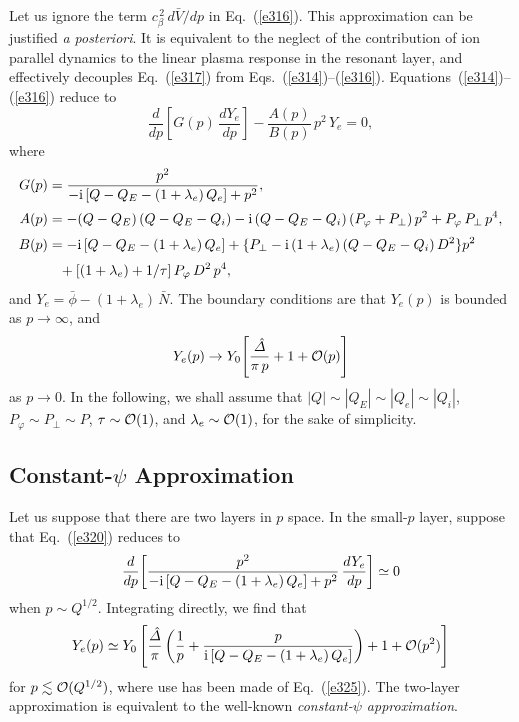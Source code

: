 \documentclass[12pt,prb,aps]{revtex4-1}
\begin{document}
Let us ignore the term $c_\beta^{\,2}\,d\bar{V}/dp$ in Eq.~(\ref{e316}). This approximation can
be justified {\em a posteriori}. It is equivalent to the neglect of the contribution of ion parallel dynamics to the linear  plasma
response in the resonant layer, and effectively decouples Eq.~(\ref{e317}) from Eqs.~(\ref{e314})--(\ref{e316}).\cite{cole,ber} Equations~(\ref{e314})--(\ref{e316}) reduce to\,\cite{cole}
\begin{equation}\label{e320}
\frac{d}{dp}\!\left[G(p)\,\frac{dY_e}{dp}\right] - \frac{A(p)}{B(p)}\,p^{2}\,Y_e = 0,
\end{equation}
where
\begin{align}
G(p)&= \frac{p^2}{-{\rm i}\,[Q-Q_E-(1+\lambda_e)\,Q_e] + p^2},\\[0.5ex]
 A(p) &= -(Q-Q_E)\,(Q-Q_E-Q_i)-{\rm i}\,(Q-Q_E-Q_i)\,(P_\varphi+P_\perp)\,p^2 + P_\varphi\,P_\perp\,p^4,\label{e45}\\[0.5ex]
 B(p) &= 
-{\rm i}\,[Q-Q_E-(1+\lambda_e)\,Q_e] +\{P_\perp - {\rm i}\,(1+\lambda_e)\,(Q-Q_E-Q_i)\,D^2\}p^2\nonumber\\[0.5ex]
&\phantom{=}+[(1+\lambda_e)+1/\tau]\,P_\varphi\,D^2\,p^4,
\end{align}
and $Y_e=\bar{\phi} - (1+\lambda_e)\,\bar{N}$. The boundary conditions are that $Y_e(p)$ is bounded as $p\rightarrow\infty$, and
\begin{equation}\label{e325}
Y_e(p)\rightarrow Y_0\!\left[\frac{\hat{\mit\Delta}}{\pi\,p} + 1+ {\cal O}(p)\right]
\end{equation}
as $p\rightarrow 0$. In the following, we shall assume that $|Q|\sim |Q_E|\sim |Q_e|\sim |Q_i|$, $P_\varphi\sim P_\perp \sim P$, $\tau\sim {\cal O}(1)$, and $\lambda_e\sim{\cal O}(1)$,  for the
sake of simplicity. 

\subsection{Constant-$\psi$ Approximation}\label{s5.6}
Let us suppose that there are two layers in $p$ space. In the small-$p$ layer, suppose that Eq.~(\ref{e320}) reduces to
\begin{equation}
\frac{d}{dp}\!\left[\frac{p^2}{-{\rm i}\,[Q-Q_E-(1+\lambda_e)\,Q_e] + p^2}\,\frac{dY_e}{dp}\right]\simeq 0
\end{equation}
when $p\sim Q^{1/2}$. Integrating directly, we find that
\begin{equation}
Y_e(p) \simeq Y_0 \left[\frac{\hat{\mit\Delta}}{\pi}\left(\frac{1}{p} + \frac{p}{{\rm i}\,[Q-Q_E-(1+\lambda_e)\,Q_e]}\right) + 1 + {\cal O}(p^2)\right]
\end{equation}
for $p\lesssim {\cal O}(Q^{1/2})$, where use has been made of Eq.~(\ref{e325}). The two-layer  approximation is
equivalent to the well-known {\em constant-$\psi$ approximation}.\cite{fkr}
\end{document}
